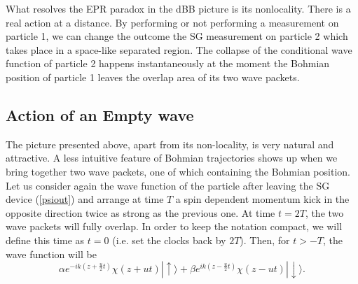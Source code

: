 \documentclass[12pt,preprint,tightenlines]{elsarticle}
\begin{document}
What resolves the EPR paradox in the dBB picture is its nonlocality.
There is a real action at a distance. By performing or not performing
a measurement on particle 1, we can change the outcome the SG
measurement on particle 2 which takes place in a space-like separated
region. The collapse of the conditional wave function of
particle 2 happens instantaneously at the moment the Bohmian position
of particle 1 leaves the overlap area of its two wave packets.


\subsection{ Action of an Empty wave}

The picture presented above, apart from its non-locality, is very
natural and attractive. A less intuitive feature of Bohmian trajectories
shows up when we bring together two wave packets, one of which containing the
Bohmian position. Let us consider again the
wave function of the particle after leaving the SG device
(\ref{psiout}) and arrange at time $T$ a spin dependent momentum
kick in the opposite direction twice as strong as the previous
one. At time $t=2T$, the two wave packets will fully overlap. In
order to keep the notation compact, we will define this time as $t=0$
(i.e. set the clocks back by $2T$). Then, for $t>-T$, the wave function
will be
\begin{equation}
\alpha e^{-ik(z+\frac{u}{2}t)}\chi(z+ut)|{\uparrow}\rangle+\beta e^{ik(z-\frac{u}{2}t)}\chi(z-ut)|{\downarrow}\rangle.\label{psioutnox1}
\end{equation}
\end{document}
